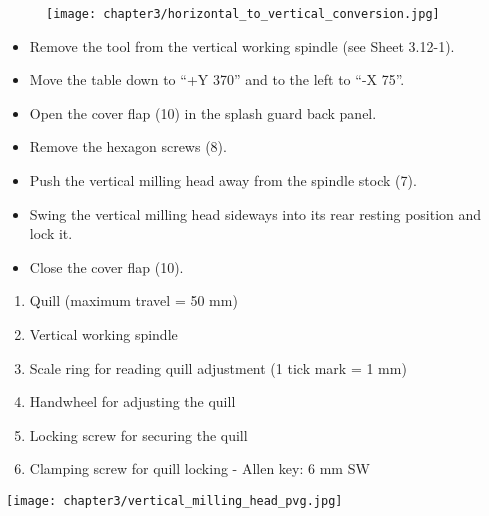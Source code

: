 
\vspace{0.3cm}



\begin{figure}[h]
    \centering
    \texttt{[image: chapter3/horizontal\_to\_vertical\_conversion.jpg]}
    \label{fig:vertical_to_horizontal_conversion}
\end{figure}

\begin{itemize}
    \item Remove the tool from the vertical working spindle (see Sheet 3.12-1).
    \item Move the table down to \enquote{+Y 370} and to the left to \enquote{-X 75}.\footnotemark
    \item Open the cover flap (10) in the splash guard back panel.
    \item Remove the hexagon screws (8).
    \item Push the vertical milling head away from the spindle stock (7).
    \item Swing the vertical milling head sideways into its rear resting position and lock it.
    \item Close the cover flap (10).
\end{itemize}



\begin{minipage}{0.5\textwidth}
    \begin{enumerate}[itemsep=1pt,parsep=0pt]
        \item Quill (maximum travel = 50 mm)
        \item Vertical working spindle
        \item Scale ring for reading quill adjustment (1 tick mark = 1 mm)
        \item Handwheel for adjusting the quill
        \item Locking screw for securing the quill
        \item Clamping screw for quill locking - Allen key: 6 mm SW
    \end{enumerate}
\end{minipage}%
\begin{minipage}{0.5\textwidth}
    \centering
    \texttt{[image: chapter3/vertical\_milling\_head\_pvg.jpg]}
\end{minipage}

